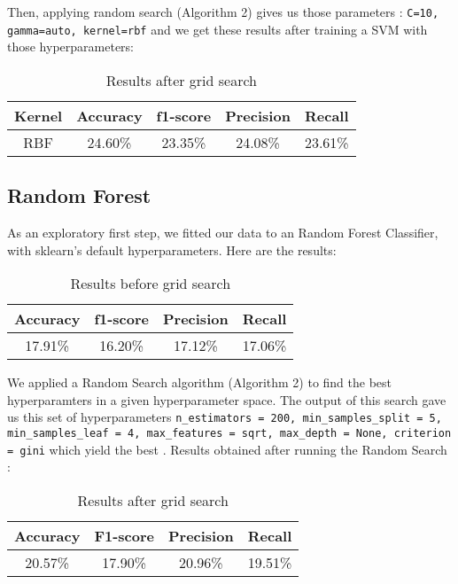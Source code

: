 \documentclass[twocolumn]{article}
\begin{document}
Then, applying random search (Algorithm 2) gives us those parameters : \texttt{C=10, gamma=auto, kernel=rbf} and we get these results after training a SVM with those hyperparameters:


\begin{table}[h]
    \centering
    \begin{tabular}{|c|c|c|c|c|}
    \hline
      Kernel & Accuracy & f1-score & Precision & Recall \\
      \hline
      RBF & 24.60\% & 23.35\% & 24.08\% & 23.61\% \\
    \hline
    \end{tabular}

    \label{tab:my_label}
    \caption{Results after grid search}
\end{table}

\subsection{Random Forest}
As an exploratory first step, we fitted our data to an Random Forest Classifier, with sklearn's default hyperparameters. Here are the results:

\begin{table}[h]
    \centering
    \begin{tabular}{|c|c|c|c|}
    \hline
      Accuracy & f1-score & Precision & Recall \\
      \hline
      17.91\% & 16.20\% & 17.12\% & 17.06\% \\
    \hline
    \end{tabular}

    \label{tab:my_label}
    \caption{Results before grid search}
\end{table}

We applied a Random Search algorithm (Algorithm 2) to find the best hyperparamters in a given hyperparameter space. The output of this search gave us this set of hyperparameters \texttt{n\_estimators = 200, min\_samples\_split = 5, min\_samples\_leaf = 4, max\_features = sqrt, max\_depth = None, criterion = gini} which yield the best . Results obtained after running the Random Search : 

\begin{table}[!h]
    \centering
    \begin{tabular}{|c|c|c|c|}
        \hline
         Accuracy & F1-score & Precision & Recall\\
        \hline
         20.57\% & 17.90\% & 20.96\% & 19.51\%\\
        \hline
    \end{tabular}
    
    \label{tab:my_label}
    \caption{Results after grid search}
\end{table}
\end{document}
